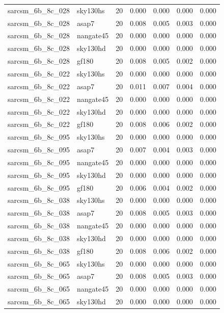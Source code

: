 \begin{tabular}{llrrrrr}
sarcsm\_6b\_8c\_028 & sky130hs & 20 & 0.000 & 0.000 & 0.000 & 0.000 \\
sarcsm\_6b\_8c\_028 & asap7 & 20 & 0.008 & 0.005 & 0.003 & 0.000 \\
sarcsm\_6b\_8c\_028 & nangate45 & 20 & 0.000 & 0.000 & 0.000 & 0.000 \\
sarcsm\_6b\_8c\_028 & sky130hd & 20 & 0.000 & 0.000 & 0.000 & 0.000 \\
sarcsm\_6b\_8c\_028 & gf180 & 20 & 0.008 & 0.005 & 0.002 & 0.000 \\
sarcsm\_6b\_8c\_022 & sky130hs & 20 & 0.000 & 0.000 & 0.000 & 0.000 \\
sarcsm\_6b\_8c\_022 & asap7 & 20 & 0.011 & 0.007 & 0.004 & 0.000 \\
sarcsm\_6b\_8c\_022 & nangate45 & 20 & 0.000 & 0.000 & 0.000 & 0.000 \\
sarcsm\_6b\_8c\_022 & sky130hd & 20 & 0.000 & 0.000 & 0.000 & 0.000 \\
sarcsm\_6b\_8c\_022 & gf180 & 20 & 0.008 & 0.006 & 0.002 & 0.000 \\
sarcsm\_6b\_8c\_095 & sky130hs & 20 & 0.000 & 0.000 & 0.000 & 0.000 \\
sarcsm\_6b\_8c\_095 & asap7 & 20 & 0.007 & 0.004 & 0.003 & 0.000 \\
sarcsm\_6b\_8c\_095 & nangate45 & 20 & 0.000 & 0.000 & 0.000 & 0.000 \\
sarcsm\_6b\_8c\_095 & sky130hd & 20 & 0.000 & 0.000 & 0.000 & 0.000 \\
sarcsm\_6b\_8c\_095 & gf180 & 20 & 0.006 & 0.004 & 0.002 & 0.000 \\
sarcsm\_6b\_8c\_038 & sky130hs & 20 & 0.000 & 0.000 & 0.000 & 0.000 \\
sarcsm\_6b\_8c\_038 & asap7 & 20 & 0.008 & 0.005 & 0.003 & 0.000 \\
sarcsm\_6b\_8c\_038 & nangate45 & 20 & 0.000 & 0.000 & 0.000 & 0.000 \\
sarcsm\_6b\_8c\_038 & sky130hd & 20 & 0.000 & 0.000 & 0.000 & 0.000 \\
sarcsm\_6b\_8c\_038 & gf180 & 20 & 0.008 & 0.006 & 0.002 & 0.000 \\
sarcsm\_6b\_8c\_065 & sky130hs & 20 & 0.000 & 0.000 & 0.000 & 0.000 \\
sarcsm\_6b\_8c\_065 & asap7 & 20 & 0.008 & 0.005 & 0.003 & 0.000 \\
sarcsm\_6b\_8c\_065 & nangate45 & 20 & 0.000 & 0.000 & 0.000 & 0.000 \\
sarcsm\_6b\_8c\_065 & sky130hd & 20 & 0.000 & 0.000 & 0.000 & 0.000 \\

\end{tabular}
